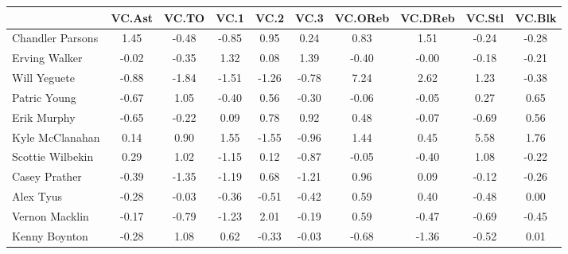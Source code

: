 \documentclass[10pt,letterpaper]{article}
\begin{document}
\begin{table}[ht]
\begin{center}
\begin{tabular}{lccccccccc}
  \hline
 & VC.Ast & VC.TO & VC.1 & VC.2 & VC.3 & VC.OReb & VC.DReb & VC.Stl & VC.Blk \\ 
  \hline
Chandler Parsons & 1.45 & -0.48 & -0.85 & 0.95 & 0.24 & 0.83 & 1.51 & -0.24 & -0.28 \\ 
  Erving Walker & -0.02 & -0.35 & 1.32 & 0.08 & 1.39 & -0.40 & -0.00 & -0.18 & -0.21 \\ 
  Will Yeguete & -0.88 & -1.84 & -1.51 & -1.26 & -0.78 & 7.24 & 2.62 & 1.23 & -0.38 \\ 
  Patric Young & -0.67 & 1.05 & -0.40 & 0.56 & -0.30 & -0.06 & -0.05 & 0.27 & 0.65 \\ 
  Erik Murphy & -0.65 & -0.22 & 0.09 & 0.78 & 0.92 & 0.48 & -0.07 & -0.69 & 0.56 \\ 
  Kyle McClanahan & 0.14 & 0.90 & 1.55 & -1.55 & -0.96 & 1.44 & 0.45 & 5.58 & 1.76 \\ 
  Scottie Wilbekin & 0.29 & 1.02 & -1.15 & 0.12 & -0.87 & -0.05 & -0.40 & 1.08 & -0.22 \\ 
  Casey Prather & -0.39 & -1.35 & -1.19 & 0.68 & -1.21 & 0.96 & 0.09 & -0.12 & -0.26 \\ 
  Alex Tyus & -0.28 & -0.03 & -0.36 & -0.51 & -0.42 & 0.59 & 0.40 & -0.48 & 0.00 \\ 
  Vernon Macklin & -0.17 & -0.79 & -1.23 & 2.01 & -0.19 & 0.59 & -0.47 & -0.69 & -0.45 \\ 
  Kenny Boynton & -0.28 & 1.08 & 0.62 & -0.33 & -0.03 & -0.68 & -1.36 & -0.52 & 0.01 \\ 
   \hline
\end{tabular}
\end{center}
\end{table}
\end{document}
